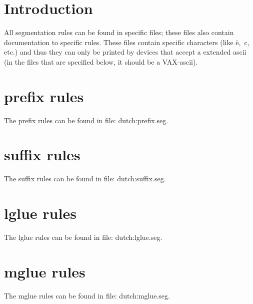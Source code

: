 
   \RosDate{\today}
   \RosSupersedes{-}
   \MakeRosTitle

\section{Introduction}

All segmentation rules can be found in specific files; these files also
contain documentation to specific rules. These files contain specific
characters (like \"{e}, \,{c}, etc.) and thus they can only be
printed by devices that accept a extended ascii (in the files that are
specified below, it should be a VAX-ascii).

\section{prefix rules}

The prefix rules can be found in file:
dutch:prefix.seg.

\section{suffix rules}

The suffix rules can be found in file:
dutch:suffix.seg.

\section{lglue rules}

The lglue rules can be found in file:
dutch:lglue.seg.

\section{mglue rules}

The mglue rules can be found in file:
dutch:mglue.seg.


